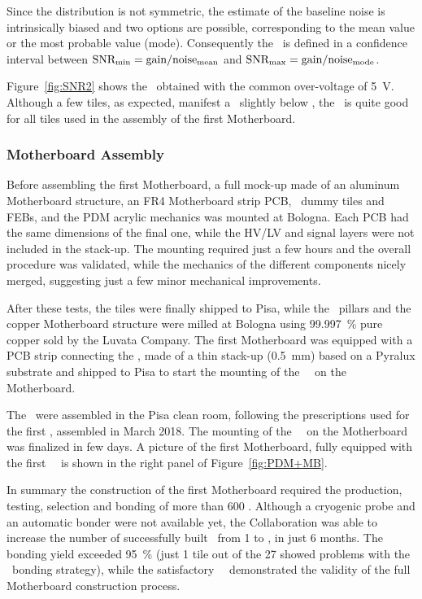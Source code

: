 Since the distribution is not symmetric, the estimate of the baseline noise is intrinsically biased and two options are possible, corresponding to the mean value or the most probable value (mode). Consequently the \SNR\ is defined in a confidence interval between $\mbox{SNR}_{\rm min} = {\rm gain}/{\rm noise}_{\rm mean}$ and $\mbox{SNR}_{\rm max} = {\rm gain}/{\rm noise}_{\rm mode}$.

Figure~\ref{fig:SNR2} shows the \SNR\ obtained with the common over-voltage of \SI{5}{\volt}. Although a few tiles, as expected, manifest a \SNR\ slightly below \DSkTileChargeSNRSpecification, the \SNR\ is quite good for all tiles used in the assembly of the first Motherboard.


\subsubsection{Motherboard Assembly}

Before assembling the first Motherboard, a full mock-up made of an aluminum Motherboard structure, an FR4 Motherboard strip PCB, \DSkSQBPdmsNumber\ dummy tiles and FEBs, and the PDM acrylic mechanics was mounted at Bologna. Each PCB had the same dimensions of the final one, while the HV/LV and signal layers were not included in the stack-up. The mounting required just a few hours and the overall procedure was validated, while the mechanics of the different components nicely merged, suggesting just a few minor mechanical improvements. 

After these tests, the tiles were finally shipped to Pisa, while the \DSkPdm\ pillars and the copper Motherboard structure were milled at Bologna using \SI{99.997}{\percent} pure copper sold by the Luvata Company. The first Motherboard was equipped with a PCB strip connecting the \DSkPdms, made of a thin stack-up (\SI{0.5}{\milli\meter}) based on a Pyralux substrate and shipped to Pisa to start the mounting of the \DSkSQBPdmsNumber\ \DSkPdms\ on the Motherboard. 

The \DSkPdms\ were assembled in the Pisa clean room, following the prescriptions used for the first \DSkPdm, assembled in March 2018. The mounting of the \DSkSQBPdmsNumber\ \DSkPdms\ on the Motherboard was finalized in few days.  A picture of the first Motherboard, fully equipped with the first \DSkSQBPdmsNumber\  \DSkPdms\ is shown in the right panel of Figure~\ref{fig:PDM+MB}.

In summary the construction of the first Motherboard required the production, testing, selection and bonding of more than 600 \SiPMs. Although a cryogenic probe and an automatic bonder were not available yet, the Collaboration was able to increase the number of successfully built \DSkPdms\ from 1 to \DSkSQBPdmsNumber, in just \num{6} months. The bonding yield exceeded \SI{95}{\percent} (just 1 tile out of the 27 showed problems with the \SiPM\ bonding strategy), while the satisfactory \DSkPdm\ \SNR\ demonstrated the validity of the full Motherboard construction process.

